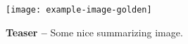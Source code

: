 \begin{figure}[t]
\begin{center}
\texttt{[image: example-image-golden]}
\end{center}
\caption{
% 
\textbf{Teaser -- }
Some nice summarizing image.
}
\label{fig:teaser}
\end{figure}